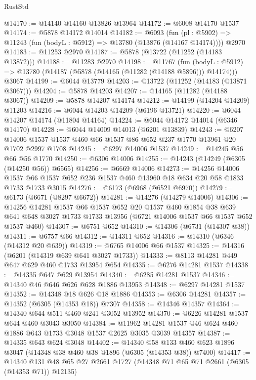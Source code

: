 \begin{lexlean}{RustStd}
\begin{coremodule}
@14170 := @14140 @14160 @13826 @13964
@14172 := @6008 @14170 @1537
@14174 := @5878 @14172 @14014
@14182 := @6093
    (fun (pl : @5902) => @11243 (fun (bodyL : @5912) => @13780 (@13876 (@14167 @14174))))
    @2970
@14183 := @11253 @2970
@14187 := @5878 (@13722 (@11252 (@14183 @13872)))
@14188 := @11283 @2970
@14198 := @11767
    (fun (bodyL : @5912) => @13780 (@14187 (@5878 (@14165 (@11282 (@14188 @5896))) @14174)))
    @3067
@14199 := @6044 @13779
@14203 := @13722 (@11252 (@14183 (@13871 @3067)))
@14204 := @5878 @14203
@14207 := @14165 (@11282 (@14188 @3067))
@14209 := @5878 @14207 @14174
@14212 := @14199 (@14204 @14209) @11203
@14216 := @6044 @14203 @14209 (@6196 @13721)
@14220 := @6044 @14207 @14174 (@11804 @14164)
@14224 := @6044 @14172 @14014 (@6346 @14170)
@14228 := @6044 @14009 @14013 (@6201 @13839)
@14243 := @6207 @14006 @1537 @1537 @460 @66 @1537 @86 @652 @237 @1770 @13961 @20 @1702 @2997 @1708
@14245 := @6297 @14006 @1537
@14249 := @14245 @56 @66 @56 @1770
@14250 := @6306 @14006
@14255 := @14243 (@14249 (@6305 (@14250 @56)) @6565)
@14256 := @6669 @14006
@14273 := @14256
    @14006
    @1537
    @66
    @1537
    @652
    @236
    @1537
    @460
    @13960
    @18
    @634
    @20
    @58
    @1833
    @1733
    @1733
    @3015
@14276 := @6173 (@6968 (@6521 @6970))
@14279 := @6173 (@6671 (@8297 @6672))
@14281 := @14276 (@14279 @14006)
@14306 := @14256
    @14281
    @1537
    @66
    @1537
    @652
    @20
    @1537
    @460
    @1854
    @38
    @639
    @641
    @648
    @3027
    @1733
    @1733
    @13956
    (@6721 @14006 @1537 @66 @1537 @652 @1537 @460)
@14307 := @6751 @652
@14310 := @14306 (@6731 (@14307 @38))
@14311 := @6757 @66
@14312 := @14311 @652
@14316 := @14310 (@6346 (@14312 @20 @639))
@14319 := @6765 @14006 @66 @1537
@14325 := @14316 (@6201 (@14319 @639 @641 @3027 @1733))
@14333 := @8113 @14281 @449 @647 @629 @460 @1733 @13954 @654
@14335 := @6276 @14281 @1537
@14338 := @14335 @647 @629 @13954
@14340 := @6285 @14281 @1537
@14346 := @14340 @46 @646 @626 @628 @1886 @13953
@14348 := @6297 @14281 @1537
@14352 := @14348 @18 @626 @18 @1886
@14353 := @6306 @14281
@14357 := @14352 (@6305 (@14353 @18)) @7307
@14358 := @14346 @14357
@14364 := @14340 @644 @511 @460 @241 @3052 @13952
@14370 := @6226 @14281 @1537 @644 @460 @3043 @3050
@14384 := @11962 @14281 @1537 @46 @624 @460 @1886 @643 @1733 @3048 @1537 @2625 @3035 @3039 @14357
@14387 := @14335 @643 @624 @3048
@14402 := @14340
    @58
    @133
    @460
    @623
    @1896
    @3047
    (@14348 @38 @460 @38 @1896 (@6305 (@14353 @38)) @7400)
@14417 := @14340 @131 @48 @65 @27 @2661 @1727 (@14348 @71 @65 @71 @2661 (@6305 (@14353 @71)) @12135)

\end{coremodule}
\end{lexlean}
